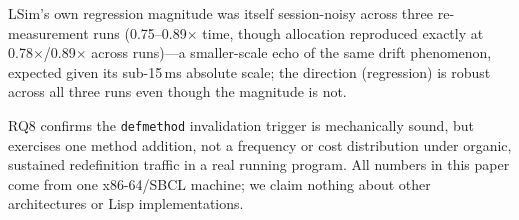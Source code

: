 \documentclass[sigplan,review,anonymous]{acmart}
\begin{document}
LSim's own regression magnitude was itself session-noisy across three re-measurement runs (0.75--0.89$\times$ time, though allocation reproduced exactly at 0.78$\times$/0.89$\times$ across runs)---a smaller-scale echo of the same drift phenomenon, expected given its sub-15\,ms absolute scale; the direction (regression) is robust across all three runs even though the magnitude is not.

RQ8 confirms the \texttt{defmethod} invalidation trigger is mechanically sound, but exercises one method addition, not a frequency or cost distribution under organic, sustained redefinition traffic in a real running program. All numbers in this paper come from one x86-64/SBCL machine; we claim nothing about other architectures or Lisp implementations.
\end{document}
